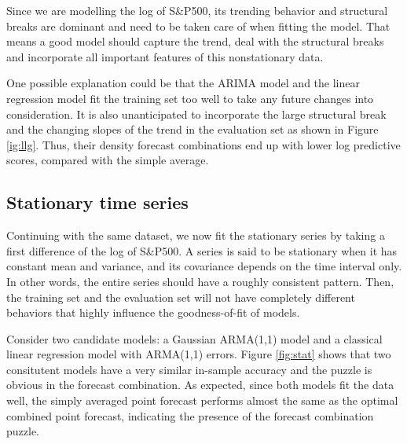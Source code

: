 \documentclass{monashthesis}
\begin{document}
Since we are modelling the log of S\&P500, its trending behavior and structural breaks are dominant and need to be taken care of when fitting the model. That means a good model should capture the trend, deal with the structural breaks and incorporate all important features of this nonstationary data.

One possible explanation could be that the ARIMA model and the linear regression model fit the training set too well to take any future changes into consideration. It is also unanticipated to incorporate the large structural break and the changing slopes of the trend in the evaluation set as shown in Figure \ref{ig:llg}. Thus, their density forecast combinations end up with lower log predictive scores, compared with the simple average.

\hypertarget{stationary-time-series}{%
\subsection{Stationary time series}\label{stationary-time-series}}

Continuing with the same dataset, we now fit the stationary series by taking a first difference of the log of S\&P500. A series is said to be stationary when it has constant mean and variance, and its covariance depends on the time interval only. In other words, the entire series should have a roughly consistent pattern. Then, the training set and the evaluation set will not have completely different behaviors that highly influence the goodness-of-fit of models.

Consider two candidate models: a Gaussian ARMA(1,1) model and a classical linear regression model with ARMA(1,1) errors. Figure \ref{fig:stat} shows that two consitutent models have a very similar in-sample accuracy and the puzzle is obvious in the forecast combination. As expected, since both models fit the data well, the simply averaged point forecast performs almost the same as the optimal combined point forecast, indicating the presence of the forecast combination puzzle.
\end{document}
